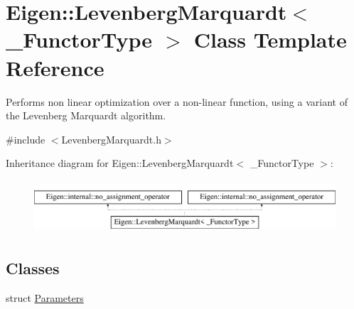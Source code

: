 \hypertarget{class_eigen_1_1_levenberg_marquardt}{}\section{Eigen\+:\+:Levenberg\+Marquardt$<$ \+\_\+\+Functor\+Type $>$ Class Template Reference}
\label{class_eigen_1_1_levenberg_marquardt}


Performs non linear optimization over a non-\/linear function, using a variant of the Levenberg Marquardt algorithm.  




{\ttfamily \#include $<$Levenberg\+Marquardt.\+h$>$}

Inheritance diagram for Eigen\+:\+:Levenberg\+Marquardt$<$ \+\_\+\+Functor\+Type $>$\+:\begin{figure}[H]
\begin{center}
\leavevmode
\includegraphics[height=2.000000cm]{class_eigen_1_1_levenberg_marquardt}
\end{center}
\end{figure}
\subsection*{Classes}
\begin{DoxyCompactItemize}
\item 
struct \hyperlink{struct_eigen_1_1_levenberg_marquardt_1_1_parameters}{Parameters}
\end{DoxyCompactItemize}
